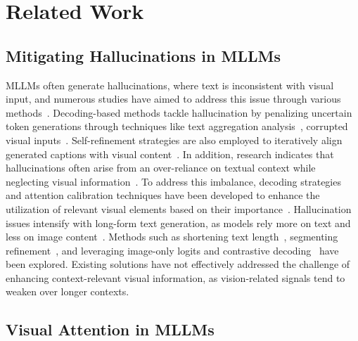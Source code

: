 \section{Related Work}
\subsection{Mitigating Hallucinations in MLLMs}  
MLLMs often generate hallucinations, where text is inconsistent with visual input, and numerous studies have aimed to address this issue through various methods~\cite{li2023evaluating, liu2024survey, gunjal2024detecting}. Decoding-based methods tackle hallucination by penalizing uncertain token generations through techniques like text aggregation analysis~\cite{huang2024opera}, corrupted visual inputs~\cite{leng2024mitigating, gong2024damro}. Self-refinement strategies are also employed to iteratively align generated captions with visual content~\cite{zhou2023analyzing, lee2023volcano}. In addition, research indicates that hallucinations often arise from an over-reliance on textual context while neglecting visual information~\cite{zhu2024ibd, liu2025paying}. To address this imbalance, decoding strategies and attention calibration techniques have been developed to enhance the utilization of relevant visual elements based on their importance~\cite{huo2024self, liu2025paying,li2025mitigating}. Hallucination issues intensify with long-form text generation, as models rely more on text and less on image content~\cite{favero2024multi, lee2024toward, zhong2024investigating}. Methods such as shortening text length~\cite{yue2024less}, segmenting refinement~\cite{lee2024toward}, and leveraging image-only logits and contrastive decoding~\cite{zhong2024investigating,favero2024multi} have been explored. Existing solutions have not effectively addressed the challenge of enhancing context-relevant visual information, as vision-related signals tend to weaken over longer contexts.

\subsection{Visual Attention in MLLMs}

